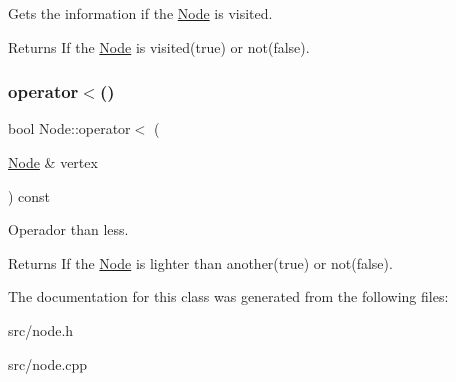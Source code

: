 Gets the information if the \mbox{\hyperlink{class_node}{Node}} is visited. 

\begin{DoxyReturn}{Returns}
If the \mbox{\hyperlink{class_node}{Node}} is visited(true) or not(false). 
\end{DoxyReturn}
\mbox{\label{class_node_aa2521fef8b2cbf414a8b22a84baa196e}} 
\subsubsection{\texorpdfstring{operator$<$()}{operator<()}}
{\footnotesize\ttfamily bool Node\+::operator$<$ (\begin{DoxyParamCaption}\item[{\mbox{\hyperlink{class_node}{Node}} \&}]{vertex }\end{DoxyParamCaption}) const}



Operador than less. 

\begin{DoxyReturn}{Returns}
If the \mbox{\hyperlink{class_node}{Node}} is lighter than another(true) or not(false). 
\end{DoxyReturn}


The documentation for this class was generated from the following files\+:\begin{DoxyCompactItemize}
\item 
src/node.\+h\item 
src/node.\+cpp\end{DoxyCompactItemize}
